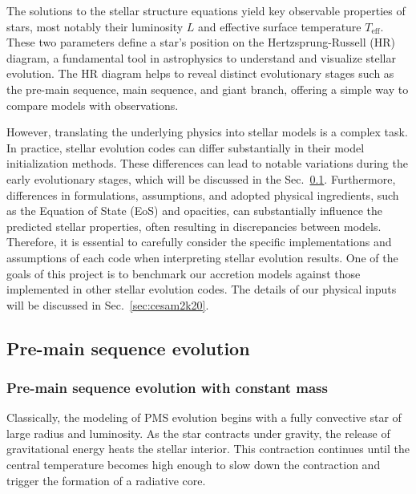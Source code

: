\documentclass[12pt,a4paper]{article}
\newcommand{\mr}{\mathrm}
\begin{document}
The solutions to the stellar structure equations yield key observable properties of stars, most notably their luminosity $L$ and effective surface temperature $T_\mr{eff}$. These two parameters define a star's position on the Hertzsprung-Russell (HR) diagram, a fundamental tool in astrophysics to understand and visualize stellar evolution. The HR diagram helps to reveal distinct evolutionary stages such as the pre-main sequence, main sequence, and giant branch, offering a simple way to compare models with observations.

However, translating the underlying physics into stellar models is a complex task. In practice, stellar evolution codes can differ substantially in their model initialization methods. These differences can lead to notable variations during the early evolutionary stages, which will be discussed in the Sec.~\ref{sec:pms_evolution}. Furthermore, differences in formulations, assumptions, and adopted physical ingredients, such as the Equation of State (EoS) and opacities, can substantially influence the predicted stellar properties, often resulting in discrepancies between models. Therefore, it is essential to carefully consider the specific implementations and assumptions of each code when interpreting stellar evolution results. One of the goals of this project is to benchmark our accretion models against those implemented in other stellar evolution codes. The details of our physical inputs will be discussed in Sec.~\ref{sec:cesam2k20}. 

\subsection{Pre-main sequence evolution}
\label{sec:pms_evolution}

\subsubsection{Pre-main sequence evolution with constant mass}
\label{sec:pms_const_mass}

Classically, the modeling of PMS evolution begins with a fully convective star of large radius and luminosity. As the star contracts under gravity, the release of gravitational energy heats the stellar interior. This contraction continues until the central temperature becomes high enough to slow down the contraction and trigger the formation of a radiative core.
\end{document}
